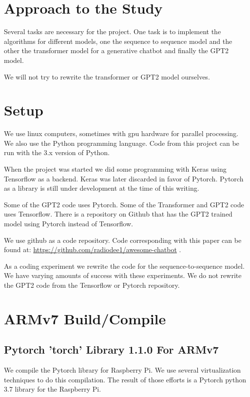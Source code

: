 \section{Approach to the Study}

Several tasks are necessary for the project. One task is to implement
the algorithms for different models, one the sequence to sequence model
and the other the transformer model for a generative chatbot and finally the GPT2 model.

We will not try to rewrite the transformer or GPT2 model ourselves.

\section{Setup}

We use linux computers, sometimes with gpu hardware for parallel processing.
We also use the Python programming language. Code from this project
can be run with the 3.x version of Python.

When the project was started we did some programming with Keras using
Tensorflow as a backend. Keras was later discarded in favor of Pytorch.
Pytorch as a library is still under development at the time of this
writing.

Some of the GPT2 code uses Pytorch. Some of the Transformer and GPT2 code uses Tensorflow. There
is a repository on Github that has the GPT2 trained model using Pytorch instead of Tensorflow.

We use github as a code repository. Code corresponding with this paper
can be found at: \href{https://github.com/radiodee1/awesome-chatbot}{https://github.com/radiodee1/awesome-chatbot}
. 

As a coding experiment we rewrite the code for the sequence-to-sequence model. We have varying amounts of success with these experiments. We do not rewrite the GPT2 code from the Tensorflow or Pytorch repository.

\section{ARMv7 Build/Compile}

\subsection*{Pytorch 'torch' Library 1.1.0 For ARMv7}
We compile the Pytorch library for Raspberry Pi. We use several virtualization techniques to do this compilation. The result of those efforts is a Pytorch python 3.7 library for the Raspberry Pi.

